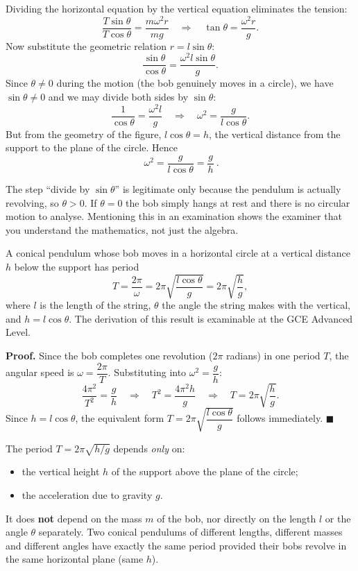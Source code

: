 \documentclass[11pt]{article}
\newcounter{popsec}
\newcounter{popsub}
\newcommand{\courssub}[1]{%
  \stepcounter{popsub}%
  \par\vspace{9pt}\noindent{\popxbold\fontsize{11.5}{13}\selectfont\color{popink}{\color{poporange}\thepopsec.\thepopsub}\hspace{6pt}#1}\par\nopagebreak\vspace{4pt}
}
\begin{document}
Dividing the horizontal equation by the vertical equation eliminates the tension:
\[
\frac{T\sin\theta}{T\cos\theta} = \frac{m\omega^{2}r}{mg}
\quad\Longrightarrow\quad
\tan\theta = \frac{\omega^{2}r}{g}.
\]
Now substitute the geometric relation $r = l\sin\theta$:
\[
\frac{\sin\theta}{\cos\theta} = \frac{\omega^{2}l\sin\theta}{g}.
\]
Since $\theta \neq 0$ during the motion (the bob genuinely moves in a circle), we have $\sin\theta \neq 0$ and we may divide both sides by $\sin\theta$:
\[
\frac{1}{\cos\theta} = \frac{\omega^{2}l}{g}
\quad\Longrightarrow\quad
\omega^{2} = \frac{g}{l\cos\theta}.
\]
But from the geometry of the figure, $l\cos\theta = h$, the vertical distance from the support to the plane of the circle. Hence
\[
\boxed{\ \omega^{2} = \frac{g}{l\cos\theta} = \frac{g}{h}\ }.
\]

\begin{attention}
The step ``divide by $\sin\theta$'' is legitimate only because the pendulum is actually revolving, so $\theta > 0$. If $\theta = 0$ the bob simply hangs at rest and there is no circular motion to analyse. Mentioning this in an examination shows the examiner that you understand the mathematics, not just the algebra.
\end{attention}

\courssub{The Period of the Conical Pendulum}

\begin{propriete}
A conical pendulum whose bob moves in a horizontal circle at a vertical distance $h$ below the support has period
\[
T = \frac{2\pi}{\omega} = 2\pi\sqrt{\frac{l\cos\theta}{g}} = 2\pi\sqrt{\frac{h}{g}},
\]
where $l$ is the length of the string, $\theta$ the angle the string makes with the vertical, and $h = l\cos\theta$. The derivation of this result is examinable at the GCE Advanced Level.
\end{propriete}

\textbf{Proof.} Since the bob completes one revolution ($2\pi$ radians) in one period $T$, the angular speed is $\omega = \dfrac{2\pi}{T}$. Substituting into $\omega^{2} = \dfrac{g}{h}$:
\[
\frac{4\pi^{2}}{T^{2}} = \frac{g}{h}
\quad\Longrightarrow\quad
T^{2} = \frac{4\pi^{2}h}{g}
\quad\Longrightarrow\quad
T = 2\pi\sqrt{\frac{h}{g}}.
\]
Since $h = l\cos\theta$, the equivalent form $T = 2\pi\sqrt{\dfrac{l\cos\theta}{g}}$ follows immediately. \hfill$\blacksquare$

\begin{aretenir}
The period $T = 2\pi\sqrt{h/g}$ depends \emph{only} on:
\begin{itemize}
\item the vertical height $h$ of the support above the plane of the circle;
\item the acceleration due to gravity $g$.
\end{itemize}
It does \textbf{not} depend on the mass $m$ of the bob, nor directly on the length $l$ or the angle $\theta$ separately. Two conical pendulums of different lengths, different masses and different angles have exactly the same period provided their bobs revolve in the same horizontal plane (same $h$).
\end{aretenir}
\end{document}
